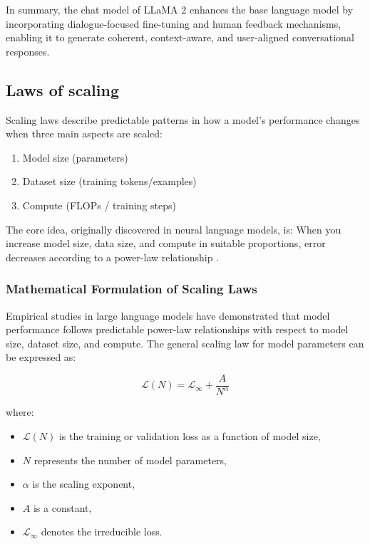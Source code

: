 In summary, the chat model of LLaMA 2 enhances the base language model by incorporating dialogue-focused fine-tuning and human feedback mechanisms, enabling it to generate coherent, context-aware, and user-aligned conversational responses.


\subsection{Laws of scaling \cite{Kaplan2020Scaling}}
Scaling laws describe predictable patterns in how a model’s performance changes when three main aspects are scaled:
\begin{enumerate}
    \item Model size (parameters)
    \item Dataset size (training tokens/examples)
    \item Compute (FLOPs / training steps)
\end{enumerate}
The core idea, originally discovered in neural language models, is:
When you increase model size, data size, and compute in suitable proportions, error decreases according to a power-law relationship \cite{Kaplan2020Scaling}.

\subsubsection{Mathematical Formulation of Scaling Laws}

Empirical studies in large language models have demonstrated that model performance follows predictable power-law relationships with respect to model size, dataset size, and compute. The general scaling law for model parameters can be expressed as:

\begin{equation}
\mathcal{L}(N) = \mathcal{L}_{\infty} + \frac{A}{N^{\alpha}}
\end{equation}

where:
\begin{itemize}
    \item $\mathcal{L}(N)$ is the training or validation loss as a function of model size,
    \item $N$ represents the number of model parameters,
    \item $\alpha$ is the scaling exponent,
    \item $A$ is a constant,
    \item $\mathcal{L}_{\infty}$ denotes the irreducible loss.
\end{itemize}

